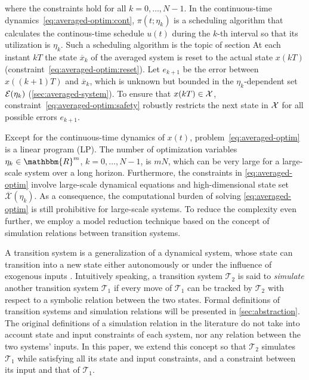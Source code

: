 where the constraints hold for all $k = 0, \ldots, N - 1$.
In the continuous-time dynamics~\eqref{eq:averaged-optim:cont}, $\pi (t ; \eta_k)$ is a scheduling algorithm that calculates the continous-time schedule $u (t)$ during the $k$-th interval so that
its utilization is $\eta_k$.
Such a scheduling algorithm is the topic of section 
At each instant $kT$ the state $\overbar{x}_{k}$ of the averaged system is reset to the actual state $x (kT)$ (constraint~\eqref{eq:averaged-optim:reset}).
Let $e_{k+1}$ be the error between $x((k+1)T)$ and $\overbar{x}_{k}$, which is unknown but bounded in the $\eta_k$-dependent set $\mathcal{E}(\eta_{k})$ (\cf \cref{sec:averaged-system}).
To ensure that $x (k T) \in \mathcal{X}$, constraint~\eqref{eq:averaged-optim:safety} robustly restricts the next state in $\mathcal{X}$ for all possible errors $e_{k+1}$.

Except for the continuous-time dynamics of $x (t)$, problem~\eqref{eq:averaged-optim} is a linear program (LP).
The number of optimization variables $\eta_k \in \mathbbm{R}^m$, $k = 0, \ldots, N - 1$, is $mN$, which can be very large for a large-scale system over a long horizon.
Furthermore, the constraints in \eqref{eq:averaged-optim} involve large-scale dynamical
equations and high-dimensional state set $\overbar{\mathcal{X}} (\eta_k)$. As
a consequence, the computational burden of solving \eqref{eq:averaged-optim}
is still prohibitive for large-scale systems. To reduce the complexity even
further, we employ a model reduction technique based on the concept of
simulation relations between transition systems.

A transition system is a generalization of a dynamical system, whose state can
transition into a new state either autonomously or under the influence of
exogenous inputs . Intuitively speaking, a
transition system $\mathcal{T}_2$ is said to {\emph{simulate}} another
transition system $\mathcal{T}_1$ if every move of $\mathcal{T}_1$ can be
tracked by $\mathcal{T}_2$ with respect to a symbolic relation between the two
states. Formal definitions of transition systems and simulation relations will
be presented in \cref{sec:abstraction}. The original definitions of a
simulation relation in the literature do not take into account state and input
constraints of each system, nor any relation between the two systems' inputs.
In this paper, we extend this concept so that $\mathcal{T}_2$ simulates
$\mathcal{T}_1$ while satisfying all its state and input constraints, and a
constraint between its input and that of $\mathcal{T}_1$.

